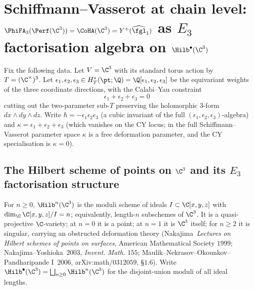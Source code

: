 \section*{Schiffmann--Vasserot at chain level: $\PhiFA_3(\Perf(\C^3)) = \CoHA(\C^3) = Y^+(\widehat{\fgl}_1)$ as $E_3$ factorisation algebra on $\Hilb^\bullet(\C^3)$}
\label{sec:sv-chain-level-e3-factorization-cfg2026}

Fix the following data. Let $V = \C^3$ with its standard torus action
by $T = (\C^\times)^3$. Let $\epsilon_1, \epsilon_2, \epsilon_3 \in
H^*_T(\pt; \Q) = \Q[\epsilon_1, \epsilon_2, \epsilon_3]$ be the
equivariant weights of the three coordinate directions, with the
Calabi--Yau constraint
\[
 \epsilon_1 + \epsilon_2 + \epsilon_3 = 0
\]
cutting out the two-parameter sub-$T$ preserving the holomorphic
$3$-form $dx \wedge dy \wedge dz$. Write $\hbar = -\epsilon_1
\epsilon_2 \epsilon_3$ (a cubic invariant of the full $(\epsilon_1,
\epsilon_2, \epsilon_3)$-algebra) and $\kappa = \epsilon_1 + \epsilon_2
+ \epsilon_3$ (which vanishes on the CY locus; in the full
Schiffmann--Vasserot parameter space $\kappa$ is a free deformation
parameter, and the CY specialisation is $\kappa = 0$).

\subsection*{The Hilbert scheme of points on $\C^3$ and its $E_3$ factorisation structure}

\begin{definition}
\label{def:hilb-c3-n}
\ClaimStatusDefinitional
For $n \geq 0$, $\Hilb^n(\C^3)$ is the moduli scheme of ideals
$I \subset \C[x, y, z]$ with $\dim_\C \C[x, y, z] / I = n$; equivalently,
length-$n$ subschemes of $\C^3$. It is a quasi-projective $\C$-variety;
at $n = 0$ it is a point; at $n = 1$ it is $\C^3$ itself; for $n \geq 2$
it is singular, carrying an obstructed deformation theory
(Nakajima~\textit{Lectures on Hilbert schemes of points on surfaces},
American Mathematical Society $1999$; Nakajima--Yoshioka~$2003$,
\textit{Invent. Math.} $155$; Maulik--Nekrasov--Okounkov--Pandharipande
$\mathrm{I}$~$2006$, arXiv:math/$0312059$, \S$1.6$). Write
$\Hilb^\bullet(\C^3) = \bigsqcup_{n \geq 0} \Hilb^n(\C^3)$ for the
disjoint-union moduli of all ideal lengths.
\end{definition}

